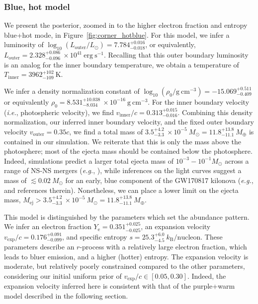 \documentclass[twocolumn, twocolappendix]{aastex63}
\def\eg{{\it e.g.}}
\def\ie{{\it i.e.}}
\begin{document}
\subsubsection{Blue, hot model}\label{sssc:bluehot}

We present the posterior, zoomed in to the higher electron fraction and entropy blue+hot mode, in Figure~\ref{fig:corner_hotblue}. For this model, we infer a luminosity of $\log_{10}(L_\mathrm{outer}/L_{\odot}) = 7.784^{+0.016}_{-0.018}$, or equivalently, $L_{\mathrm{outer}} = 2.328^{+0.086}_{-0.096}~\times 10^{41}~\mathrm{erg~s^{-1}}$. Recalling that this outer boundary luminosity is an analog for the inner boundary temperature, we obtain a temperature of $T_{\mathrm{inner}} = 3962^{+102}_{-109}~\mathrm{K}$.  

We infer a density normalization constant of $\log_{10} (\rho_0 / \mathrm{g~cm^{-3}}) = -15.069^{+0.511}_{-0.409}$ or equivalently $\rho_0 = 8.531^{+10.038}_{-8.034}~\times 10^{-16}~\mathrm{g~cm^{-3}}$. For the inner boundary velocity (\ie, photospheric velocity), we find $v_{\mathrm{inner}}/c = 0.313^{+0.015}_{-0.016}$. Combining this density normalization, our inferred inner boundary velocity, and the fixed outer boundary velocity $v_{\mathrm{outer}} = 0.35c$, we find a total mass of $ 3.5^{+4.2}_{-3.3}~\times 10^{-5}~M_{\odot} = 11.8^{+13.8}_{-11.1}~M_{\oplus}$ is contained in our simulation. We reiterate that this is only the mass above the photosphere; most of the ejecta mass should be contained below the photosphere. Indeed, simulations predict a larger total ejecta mass of $10^{-3} - 10^{-1} M_{\odot}$ across a range of NS-NS mergers (\eg, \citealt{fernandez16, shibata19}), while inferences on the light curves suggest a mass of $\lesssim 0.02~M_{\odot}$ for an early, blue component of the GW170817 kilonova (\eg, \citealt{villar17} and references therein). Nonetheless, we can place a lower limit on the ejecta mass, $M_{\mathrm{ej}} > 3.5^{+4.2}_{-3.3}~\times 10^{-5}~M_{\odot} = 11.8^{+13.8}_{-11.1}~M_{\oplus}$.

This model is distinguished by the parameters which set the abundance pattern. We infer an electron fraction $Y_{\mathrm{e}} = 0.351^{+0.025}_{-0.025}$, an expansion velocity $v_{\mathrm{exp}}/c = 0.176^{+0.091}_{-0.099}$, and specific entropy $s = 25.3^{+6.0}_{-4.5}~k_{\mathrm{B}}/\mathrm{nucleon}$. These parameters describe an $r$-process with a relatively large electron fraction, which leads to bluer emission, and a higher (hotter) entropy. The expansion velocity is moderate, but relatively poorly constrained compared to the other parameters, considering our initial uniform prior of $v_{\mathrm{exp}}/c \in [0.05, 0.30]$. Indeed, the expansion velocity inferred here is consistent with that of the purple+warm model described in the following section.
\end{document}

